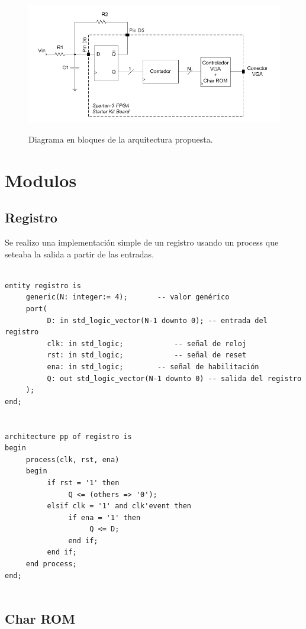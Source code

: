 \documentclass{article}
\begin{document}
\begin{figure}[h!]
  \centering
	\includegraphics[scale=0.7]{diagramaEnBloques.png}\\[1cm] 
  \caption{Diagrama en bloques de la arquitectura propuesta.}
\end{figure}

\section{Modulos}

\subsection{Registro}

Se realizo una implementación simple de un registro usando un process que seteaba la salida a partir de las entradas.

\begin{verbatim}

entity registro is
     generic(N: integer:= 4);		-- valor genérico
     port(
          D: in std_logic_vector(N-1 downto 0);	-- entrada del registro
          clk: in std_logic;			-- señal de reloj
          rst: in std_logic;			-- señal de reset
          ena: in std_logic;		-- señal de habilitación
          Q: out std_logic_vector(N-1 downto 0)	-- salida del registro
     );
end;


architecture pp of registro is
begin
     process(clk, rst, ena)
     begin
          if rst = '1' then
               Q <= (others => '0');
          elsif clk = '1' and clk'event then
               if ena = '1' then
                    Q <= D;
               end if;
          end if;
     end process;
end;


\end{verbatim}


\subsection{Char ROM}
\end{document}
